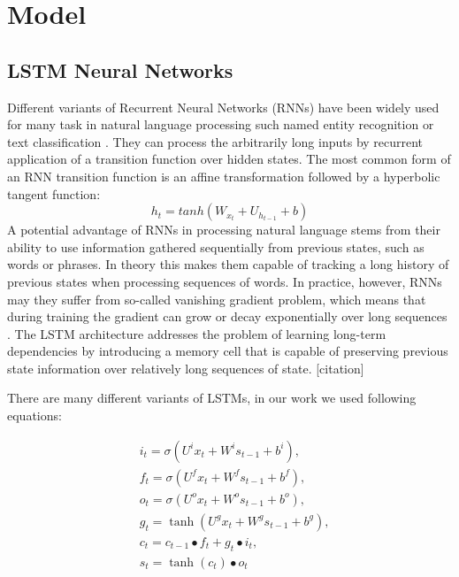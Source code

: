 \documentclass[10pt, a4paper]{article}
\begin{document}
\section{Model} 


\subsection{LSTM Neural Networks}

Different variants of Recurrent Neural Networks (RNNs) have been widely used for many task in natural language processing such named entity recognition \cite{lample2016neural} or text classification \cite{lai2015recurrent}. They can process the arbitrarily long inputs by recurrent application of a transition function over hidden states. The most common form of an RNN transition function is an affine transformation followed by a hyperbolic tangent function:
	\begin{equation} h_t = tanh(W_{x_t}+U_{h_{t-1}}+b)
\end{equation}
	A potential advantage of RNNs in processing natural language stems from their ability to use information gathered sequentially from previous states, such as words or phrases. In theory this makes them capable of tracking a long history of previous states when processing sequences of words. In practice, however, RNNs may they suffer from so-called vanishing gradient problem, which means that during training the gradient can grow or decay exponentially over long sequences \cite{bengio1994learning,hochreiter1998vanishing}. The LSTM architecture \cite{hochreiter1997long} addresses the problem of learning long-term dependencies by introducing a memory cell that is capable of preserving previous state information over relatively long sequences of state. [citation]
\par There are many different variants of LSTMs, in our work we used following equations:
		
\begin{equation}
\begin{split}
		&i_t = \sigma(U^i{x_t} + W^is_{t-1} + b^i) ,\\
		&f_t = \sigma(U^f{x_t} + W^fs_{t-1} + b^f) ,\\
		&o_t = \sigma(U^o{x_t} + W^os_{t-1} + b^o) ,\\
		&g_t = \tanh(U^g{x_t}+ W^gs_{t-1} + b^g) ,\\
		&c_t = c_{t-1} \bullet f_t + g_t \bullet i_t ,\\
		&s_t = \tanh(c_t) \bullet o_t 
\end{split}
\end{equation}
\end{document}
